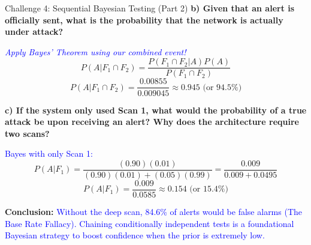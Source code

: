 \documentclass[aspectratio=169]{beamer}
\begin{document}
\begin{frame}{Challenge 4: Sequential Bayesian Testing (Part 2)}
    \small
    \textbf{b) Given that an alert is officially sent, what is the probability that the network is actually under attack?} \pause
    
    \vspace{0.2cm}
    \textcolor{blue}{\textit{Apply Bayes' Theorem using our combined event!}}
    $$ P(A | F_1 \cap F_2) = \frac{P(F_1 \cap F_2 | A)P(A)}{P(F_1 \cap F_2)} $$
    $$ P(A | F_1 \cap F_2) = \frac{0.00855}{0.009045} \approx 0.945 \text{ (or } 94.5\%) $$ \pause
    
    \textbf{c) If the system only used Scan 1, what would the probability of a true attack be upon receiving an alert? Why does the architecture require two scans?} \pause

    \textcolor{blue}{Bayes with only Scan 1:}
    $$ P(A | F_1) = \frac{(0.90)(0.01)}{(0.90)(0.01) + (0.05)(0.99)} = \frac{0.009}{0.009 + 0.0495} $$
    $$ P(A | F_1) = \frac{0.009}{0.0585} \approx 0.154 \text{ (or } 15.4\%) $$
    
    \vspace{0.2cm}
    \textbf{Conclusion:} \pause \textcolor{blue}{Without the deep scan, 84.6\% of alerts would be false alarms (The Base Rate Fallacy). Chaining conditionally independent tests is a foundational Bayesian strategy to boost confidence when the prior is extremely low.}
\end{frame}
\end{document}
